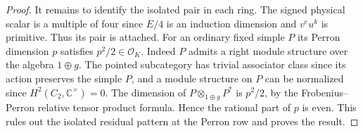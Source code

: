 \documentclass[11pt,reqno]{amsart}
\theoremstyle{remark}\newtheorem{remark}[theorem]{Remark}
\numberwithin{equation}{section}
\begin{document}
\begin{proof}
It remains to identify the isolated pair in each ring. The signed physical scalar is a multiple of four since $E/4$ is an induction dimension and $v^e u^k$ is primitive. Thus its pair is attached. For an ordinary fixed simple $P$ its Perron dimension $p$ satisfies $p^2/2\in\mathcal O_K$. Indeed $P$ admits a right module structure over the algebra $1\oplus g$. The pointed subcategory has trivial associator class since its action preserves the simple $P$, and a module structure on $P$ can be normalized since $H^2(C_2,\mathbb C^\times)=0$. The dimension of $P\otimes_{1\oplus g}P^*$ is $p^2/2$, by the Frobenius--Perron relative tensor product formula. Hence the rational part of $p$ is even. This rules out the isolated residual pattern at the Perron row and proves the result.
\end{proof}
\end{document}
